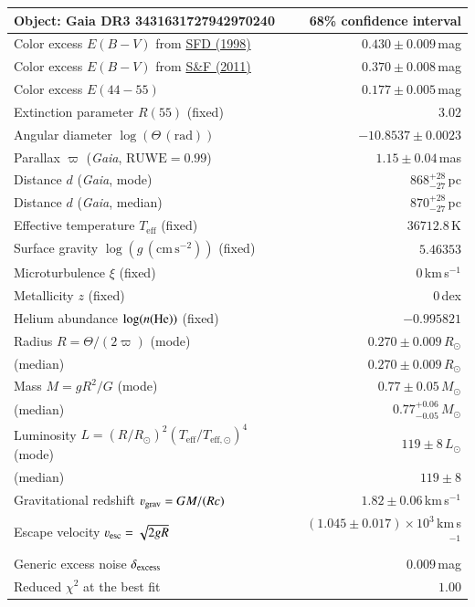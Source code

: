 \documentclass{standalone}
\begin{document}
\renewcommand{\arraystretch}{1.2}
\begin{tabular}{lr}
\hline\hline
Object: Gaia DR3 3431631727942970240 & 68\% confidence interval\\
\hline
Color excess $E(B-V)$ from \href{https://ui.adsabs.harvard.edu/abs/1998ApJ...500..525S/abstract}{SFD (1998)} & $0.430 \pm 0.009$\,mag \\
Color excess $E(B-V)$ from \href{https://ui.adsabs.harvard.edu/abs/2011ApJ...737..103S/abstract}{S\&F (2011)} & $0.370 \pm 0.008$\,mag \\
\hline
Color excess $E(44-55)$ & $0.177 \pm 0.005$\,mag \\
Extinction parameter $R(55)$ (fixed) & $3.02$ \\
Angular diameter $\log(\Theta\,\mathrm{(rad)})$ & $-10.8537 \pm 0.0023$ \\
Parallax $\varpi$ ({\it Gaia}, $\text{RUWE}=0.99$) & $1.15 \pm 0.04$\,mas \\
Distance $d$ ({\it Gaia}, mode) & $868^{+28}_{-27}$\,pc \\
Distance $d$ ({\it Gaia}, median) & $870^{+28}_{-27}$\,pc \\
Effective temperature $T_{\mathrm{eff}}$ (fixed) & $36712.8$\,K \\
Surface gravity $\log (g\,\mathrm{(cm\,s^{-2})})$ (fixed) & $5.46353$ \\
Microturbulence $\xi$ (fixed) & $0$\,km\,s$^{-1}$ \\
Metallicity $z$ (fixed) & $0$\,dex \\
Helium abundance $\log(n(\textnormal{He}))$ (fixed) & $-0.995821$ \\
Radius $R = \Theta/(2\varpi)$ (mode) & $0.270 \pm 0.009$\,$R_\odot$ \\
\phantom{Radius $R = \Theta/(2\varpi)$ }(median) & $0.270 \pm 0.009$\,$R_\odot$ \\
Mass $M = g R^2/G$ (mode) & $0.77 \pm 0.05$\,$M_\odot$ \\
\phantom{Mass $M = g R^2/G$ }(median) & $0.77^{+0.06}_{-0.05}$\,$M_\odot$ \\
Luminosity $L = (R/R_\odot)^2(T_\mathrm{eff}/T_{\mathrm{eff},\odot})^4$ (mode) & $119 \pm 8$\,$L_\odot$ \\
\phantom{Luminosity $L/L_\odot = (R/R_\odot)^2(T_\mathrm{eff}/T_{\mathrm{eff},\odot})^4$ }(median) & $119 \pm 8$ \\
Gravitational redshift $\varv_\mathrm{grav} = GM/(Rc)$ & $1.82 \pm 0.06$\,km\,s${}^{-1}$ \\
Escape velocity $\varv_\mathrm{esc} = \sqrt{2gR}$ & $\left(1.045 \pm 0.017\right)\times10^{3}$\,km\,s${}^{-1}$ \\
\hline
Generic excess noise $\delta_\textnormal{excess}$ & $0.009$\,mag \\
Reduced $\chi^2$ at the best fit & $1.00$ \\
\hline
\end{tabular}
\end{document}

